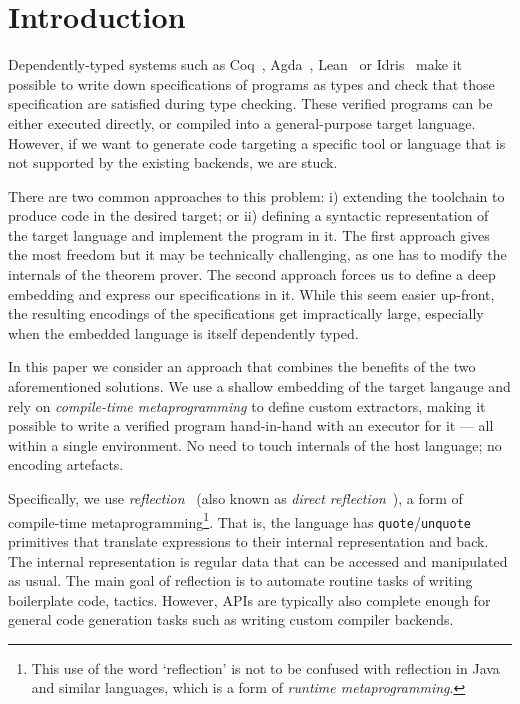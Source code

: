 \documentclass[acmsmall,review,anonymous]{acmart}\settopmatter{printfolios=true,printccs=false,printacmref=false}
\begin{document}
\section{Introduction}

Dependently-typed systems such as Coq~\cite{10.5555/1965123},
Agda~\cite{10.5555/1813347.1813352}, Lean~\cite{conf/cade/MouraKADR15}
or Idris~\cite{JFP:9060502} make it possible to write down specifications
of programs as types and check that those specification are satisfied
during type checking. These verified programs can be either executed
directly, or compiled into a
general-purpose target language.  However, if we want to generate code
targeting a specific tool or language that is not supported by the
existing backends, we are stuck.

There are two common approaches to this problem: i) extending the
toolchain to produce code in the desired target; or ii) defining
a syntactic representation of the target language and implement
the program in it.  The first approach gives the most freedom but it
may be technically challenging, as one has to modify the internals of
the theorem prover.  The second approach forces us to define
a deep embedding and express our specifications in it.  While this
seem easier up-front, the resulting encodings of the specifications
get impractically large, especially when the embedded language is
itself dependently typed.

In this paper we consider an approach that combines the benefits of
the two aforementioned solutions. We use a shallow embedding of the
target langauge and rely on \emph{compile-time
metaprogramming} to define custom extractors, making it possible to
write a verified program hand-in-hand with an executor for it --- all
within a single environment.  No need to touch internals of the host
language; no encoding artefacts.

Specifically, we use
\emph{reflection}~\cite{idris-refl, lean-refl,metacoq,agda-refl} (also
known as \emph{direct reflection}~\cite{nuprl-refl}), a form of
compile-time metaprogramming\footnote{This use of the word
`reflection' is not to be confused with reflection in Java and similar
languages, which is a form of \emph{runtime metaprogramming}.}.
%
That is, the language has \texttt{quote}/\texttt{unquote}
primitives that translate expressions to their internal representation
and back.  The internal representation is regular data that can be
accessed and manipulated as usual.  The main goal of
reflection is to automate routine tasks of writing
boilerplate code, \eg{} tactics.  However,  APIs are
typically also complete enough for general
code generation tasks such as writing custom compiler backends.
\end{document}
